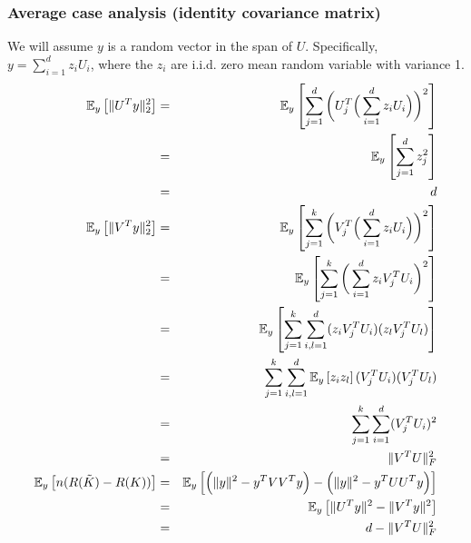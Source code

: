 \subsubsection{Average case analysis (identity covariance matrix)}
We will assume $y$ is a random vector in the span of $U$.
Specifically, $y = \sum_{i=1}^d z_i U_i$, where the $z_i$ are i.i.d. zero mean random variable with variance 1.
\begin{eqnarray*}
	\expect{y}{\|U^T y\|_2^2} &=& \expect{y}{\sum_{j=1}^d \bigg( U_j^T \Big(\sum_{i=1}^d z_i U_i\Big)\bigg)^2} \\
	&=& \expect{y}{\sum_{j=1}^d z_j^2} \\
	&=& d \\
	\expect{y}{\|V^T y\|_2^2} &=& \expect{y}{\sum_{j=1}^k \bigg( V_j^T \Big(\sum_{i=1}^d z_i U_i\Big)\bigg)^2} \\
	&=& \expect{y}{\sum_{j=1}^k \bigg(\sum_{i=1}^d z_i V_j^TU_i\bigg)^2} \\
	&=& \expect{y}{\sum_{j=1}^k \sum_{i,l=1}^d (z_i V_j^TU_i) (z_l V_j^TU_l) }\\
	&=& \sum_{j=1}^k \sum_{i,l=1}^d \expect{y}{z_i z_l} (V_j^TU_i) (V_j^TU_l) \\
	&=& \sum_{j=1}^k \sum_{i=1}^d (V_j^TU_i)^2 \\
	&=& \|V^T U\|_F^2\\
	\expect{y}{n(R(\tK) - R(K))} &=& \expect{y}{\Big(\|y\|^2 - y^T VV^T y\Big) - \Big(\|y\|^2 - y^T UU^T y\Big)}\\
	&=& \expect{y}{\|U^T y\|^2 - \|V^Ty\|^2}\\
	&=& d -  \|V^T U\|_F^2\\
\end{eqnarray*}

